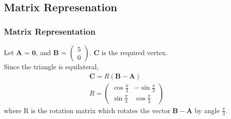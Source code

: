 \documentclass{beamer}
\providecommand{\brak}[1]{\ensuremath{\left(#1\right)}}
\theoremstyle{remark}
\providecommand{\norm}[1]{\lVert#1\rVert}
\newcommand{\myvec}[1]{\ensuremath{\begin{pmatrix}#1\end{pmatrix}}}
\let\vec\mathbf
\numberwithin{equation}{section}
\begin{document}
\subsection{Matrix Represenation}
\begin{frame}
\frametitle{Matrix Representation}
Let $\vec{A}$ = $\vec{0}$, and $\vec{B}$ = \myvec{5\\0}. $\vec{C}$ is the required vertex.\\ Since the triangle is equilateral,
\begin{align}
    \vec{C} = R\brak{\vec{B-A}}\\
    R = \myvec{\cos \frac{\pi}{3} & -\sin \frac{\pi}{3} \\ \sin \frac{\pi}{3} & \cos \frac{\pi}{3}}
\end{align}
where R is the rotation matrix which rotates the vector $\vec{B-A}$ by angle $\frac{\pi}{3}$.
\end{frame}
\end{document}
